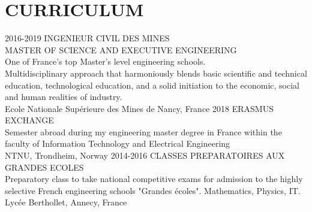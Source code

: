 \documentclass[]{cv-style}
\begin{document}
\section{CURRICULUM}
\begin{entrylist}
\entry
{2016-2019}
{INGENIEUR CIVIL DES MINES \\ MASTER OF SCIENCE AND EXECUTIVE ENGINEERING\\
{\normalfont 
    One of France's top Master’s level engineering schools. \\
    Multidisciplinary approach that harmoniously blends basic scientific and
    technical education, technological education, and a solid initiation to
    the economic, social and human realities of industry.\\
}}
{\vspace{-0.4cm}}
{ \small Ecole Nationale Supérieure des Mines 
de Nancy, France}
\entry
{2018}
{ERASMUS EXCHANGE \\
{\normalfont 
    Semester abroad during my engineering master degree in France within the
    faculty of Information Technology and Electrical Engineering\\
}}
{\vspace{-0.4cm}}
{ \small NTNU, Trondheim, Norway}
\entry
{2014-2016}
{CLASSES PREPARATOIRES AUX GRANDES ECOLES \\
{\normalfont 
    Preparatory class to take national competitive exams for admission to the
    highly selective French engineering schools "Grandes écoles". 
    Mathematics, Physics, IT.\\
}}
{\vspace{-0.4cm}}
{ \small Lycée Berthollet, Annecy, France}
%
\end{entrylist}
\vspace{-0.2cm}
\end{document}
